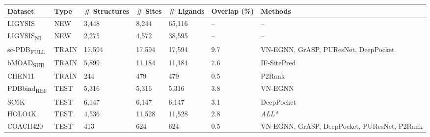 \begin{landscape}
\begin{longtable}{|M{24mm}|M{20mm}|M{27mm}|M{20mm}|M{25mm}|M{25mm}|M{58mm}|}
\hline
\textbf{Dataset}    & \textbf{Type}  & \textbf{\# Structures} & \textbf{\# Sites} & \# \textbf{Ligands} & \textbf{Overlap (\%)} & \textbf{Methods}                                      \\ \hline
\endfirsthead
%
\endhead
%
LIGYSIS    & NEW   & 3,448         & 8,244    & 65,116     & --          & --                                            \\ \hline
LIGYSIS\textsubscript{NI}  & NEW   & 2,275         & 4,572    & 38,595     & --          & --                                            \\ \hline
sc-PDB\textsubscript{FULL} & TRAIN & 17,594        & 17,594   & 17,594     & 9.7        & VN-EGNN, GrASP, PUResNet, DeepPocket         \\ \hline
bMOAD\textsubscript{SUB}   & TRAIN & 5,899         & 11,184   & 11,184     & 7.6        & IF-SitePred                                  \\ \hline
CHEN11     & TRAIN & 244           & 479      & 479        & 0.5        & P2Rank                                       \\ \hline
PDBbind\textsubscript{REF} & TEST  & 5,316         & 5,316    & 5,316      & 3.8        & VN-EGNN                                      \\ \hline
SC6K       & TEST  & 6,147         & 6,147    & 6,147      & 3.1        & DeepPocket                                   \\ \hline
HOLO4K     & TEST  & 4,536         & 11,528   & 11,528     & 2.8        & \textit{ALL*}                                         \\ \hline
COACH420   & TEST  & 413           & 624      & 624        & 0.5        & VN-EGNN, GrASP, DeepPocket, PUResNet, P2Rank \\ \hline

\end{longtable}
\end{landscape}
